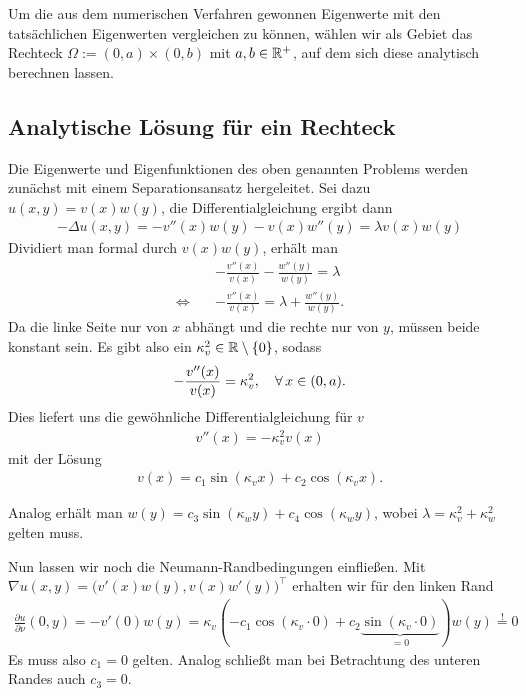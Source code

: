 \documentclass{article}
\theoremstyle{plain}
\begin{document}
Um die aus dem numerischen Verfahren gewonnen Eigenwerte mit den tatsächlichen Eigenwerten vergleichen zu können, wählen wir als Gebiet das Rechteck $\Omega := (0,a) \times (0,b)$ mit $a, b \in \mathbb{R}^+$, auf dem sich diese analytisch berechnen lassen.

\subsection{Analytische Lösung für ein Rechteck}

Die Eigenwerte und Eigenfunktionen des oben genannten Problems werden zunächst mit einem Separationsansatz hergeleitet.
Sei dazu $u(x,y) = v(x)w(y)$, die Differentialgleichung ergibt dann
\begin{align*}
	- \Delta u(x,y) = -v''(x) w(y) - v(x) w''(y) = \lambda v(x)w(y)
\end{align*}
Dividiert man formal durch $v(x)w(y)$, erhält man
\begin{align*}
	&-\frac{v''(x)}{v(x)} - \frac{w''(y)}{w(y)} = \lambda \\
	 \Leftrightarrow\quad &-\frac{v''(x)}{v(x)} = \lambda + \frac{w''(y)}{w(y)}.
\end{align*}
Da die linke Seite nur von $x$ abhängt und die rechte nur von $y$, müssen beide konstant sein. Es gibt also ein $\kappa_v^2 \in \mathbb{R} \setminus \{0\}$, sodass
\begin{align*}
	-\frac{v''(x)}{v(x)} = \kappa_v^2, \quad \forall \, x \in (0,a).
\end{align*}
Dies liefert uns die gewöhnliche Differentialgleichung für $v$
\begin{align*}
	v''(x) = -\kappa_v^2 v(x)
\end{align*}
mit der Lösung
\begin{align*}
	v(x) = c_1 \sin(\kappa_v x) + c_2 \cos(\kappa_v x).
\end{align*}

Analog erhält man $w(y) = c_3 \sin(\kappa_w y) + c_4 \cos(\kappa_w y)$, wobei $\lambda = \kappa_v^2 + \kappa_w^2$ gelten muss.

Nun lassen wir noch die Neumann-Randbedingungen einfließen. Mit $\nabla u(x,y) = \Big(v'(x)w(y), v(x)w'(y)\Big)^\top$ erhalten wir für den linken Rand
\begin{align*}
	\frac{\partial u}{\partial \nu}(0,y) = - v'(0)w(y) = \kappa_v(- c_1 \cos(\kappa_v \cdot 0) + c_2 \underbrace{\sin(\kappa_v \cdot 0)}_{=0})w(y) \stackrel{!}{=} 0
\end{align*}
Es muss also $c_1 = 0$ gelten. Analog schließt man bei Betrachtung des unteren Randes auch $c_3 = 0$.
\end{document}
